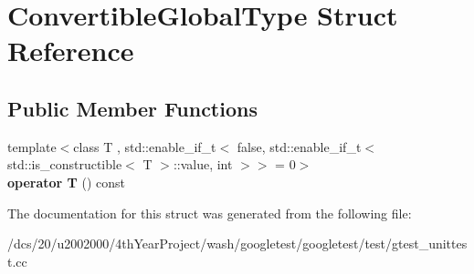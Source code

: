 \hypertarget{structConvertibleGlobalType}{}\section{Convertible\+Global\+Type Struct Reference}
\label{structConvertibleGlobalType}
\subsection*{Public Member Functions}
\begin{DoxyCompactItemize}
\item 
\mbox{\label{structConvertibleGlobalType_a174896807f8ad8940282556c1b6518c8}} 
{\footnotesize template$<$class T , std\+::enable\+\_\+if\+\_\+t$<$ false, std\+::enable\+\_\+if\+\_\+t$<$ std\+::is\+\_\+constructible$<$ T $>$\+::value, int $>$$>$  = 0$>$ }\\{\bfseries operator T} () const
\end{DoxyCompactItemize}


The documentation for this struct was generated from the following file\+:\begin{DoxyCompactItemize}
\item 
/dcs/20/u2002000/4th\+Year\+Project/wash/googletest/googletest/test/gtest\+\_\+unittest.\+cc\end{DoxyCompactItemize}
